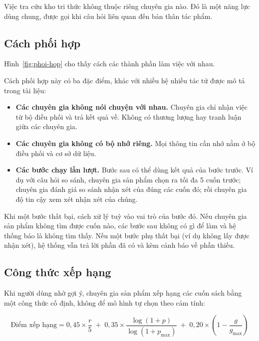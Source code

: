 Việc tra cứu kho tri thức không thuộc riêng chuyên gia nào. Đó là một năng lực dùng chung, được gọi khi câu hỏi liên quan đến bản thân tác phẩm.

\subsection{Cách phối hợp}

Hình~\ref{fig:phoi-hop} cho thấy cách các thành phần làm việc với nhau.


Cách phối hợp này có ba đặc điểm, khác với nhiều hệ nhiều tác tử được mô tả trong tài liệu:

\begin{itemize}
    \item \textbf{Các chuyên gia không nói chuyện với nhau.} Chuyên gia chỉ nhận việc từ bộ điều phối và trả kết quả về. Không có thương lượng hay tranh luận giữa các chuyên gia.
    \item \textbf{Các chuyên gia không có bộ nhớ riêng.} Mọi thông tin cần nhớ nằm ở bộ điều phối và cơ sở dữ liệu.
    \item \textbf{Các bước chạy lần lượt.} Bước sau có thể dùng kết quả của bước trước. Ví dụ với câu hỏi so sánh, chuyên gia sản phẩm chọn ra tối đa 5 cuốn trước; chuyên gia đánh giá so sánh nhận xét của đúng các cuốn đó; rồi chuyên gia độ tin cậy xem xét nhận xét của chúng.
\end{itemize}

Khi một bước thất bại, cách xử lý tuỳ vào vai trò của bước đó. Nếu chuyên gia sản phẩm không tìm được cuốn nào, các bước sau không có gì để làm và hệ thống báo là không tìm thấy. Nếu một bước phụ thất bại (ví dụ không lấy được nhận xét), hệ thống vẫn trả lời phần đã có và kèm cảnh báo về phần thiếu.

\subsection{Công thức xếp hạng}

Khi người dùng nhờ gợi ý, chuyên gia sản phẩm xếp hạng các cuốn sách bằng một công thức cố định, không để mô hình tự chọn theo cảm tính:

\[
\text{Điểm xếp hạng} = 0{,}45 \times \frac{r}{5} \;+\; 0{,}35 \times \frac{\log(1+p)}{\log(1+p_{\max})} \;+\; 0{,}20 \times \left(1 - \frac{g}{g_{\max}}\right)
\]

